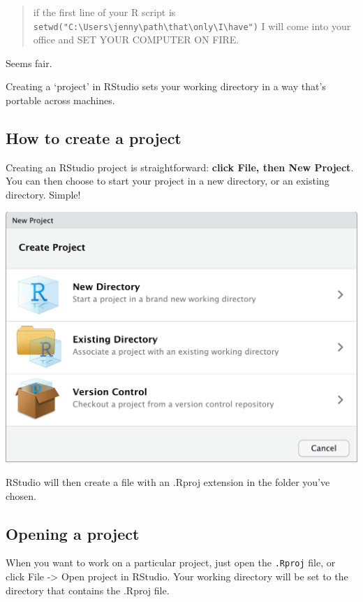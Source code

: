 \documentclass[]{book}
\begin{document}
\begin{quote}
if the first line of your R script is \texttt{setwd("C:\textbackslash{}Users\textbackslash{}jenny\textbackslash{}path\textbackslash{}that\textbackslash{}only\textbackslash{}I\textbackslash{}have")} I will come into your office and SET YOUR COMPUTER ON FIRE.
\end{quote}

Seems fair.

Creating a `project' in RStudio sets your working directory in a way that's portable across machines.

\hypertarget{how-to-create-a-project}{%
\subsection{How to create a project}\label{how-to-create-a-project}}

Creating an RStudio project is straightforward: \textbf{click File, then New Project}. You can then choose to start your project in a new directory, or an existing directory. Simple!

\begin{center}\includegraphics[width=0.66\linewidth]{atlas/rstudio_newproject} \end{center}

RStudio will then create a file with an .Rproj extension in the folder you've chosen.

\hypertarget{opening-a-project}{%
\subsection{Opening a project}\label{opening-a-project}}

When you want to work on a particular project, just open the \texttt{.Rproj} file, or click File -\textgreater{} Open project in RStudio. Your working directory will be set to the directory that contains the .Rproj file.
\end{document}
